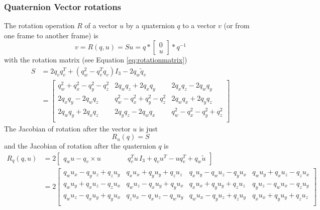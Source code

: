 \subsubsection{Quaternion Vector rotations}
The rotation operation $R$ of a vector $u$ by a quaternion $q$ to a vector $v$ (or from one frame to another frame) is 
\begin{equation}
    v = R (q, u ) = S u = q * \begin{bmatrix} 0 \\ u \end{bmatrix} * q^{-1}
\end{equation}
with the rotation matrix (see Equation \ref{eq:rotationmatrix})
\begin{align}
    S &= 2 q_v q_v^T + (q_w^2-q_v^T q_v) I_3 - 2 q_w \tilde q_v \\
    &= \begin{bmatrix}
         q_w^2 + q_x^2 - q_y^2 - q_z^2 & 2 q_w q_z + 2 q_x q_y & 2 q_x q_z - 2 q_w q_y \\
    2 q_x q_y - 2 q_w q_z & q_w^2 - q_x^2 + q_y^2 - q_z^2 & 2 q_w q_x + 2 q_y q_z \\
    2 q_w q_y + 2 q_x q_z & 2 q_y q_z - 2 q_w q_x & q_w^2 - q_x^2 - q_y^2 + q_z^2 \\
    \end{bmatrix}
\end{align}
The Jacobian of rotation after the vector $u$ is just
\begin{equation}
    R_u(q) = S
\end{equation}
and the Jacobian of rotation after the quaternion $q$ is
\begin{align}
    R_q(q,u) &=  2  \begin{bmatrix}
        q_w u - q_v \times u & \quad \quad \quad q_v^T u \, I_3 + q_v u^T - u q_v^T + q_w \tilde u
    \end{bmatrix} \\
    &= 2 \begin{bmatrix}
        q_w  u_x - q_y  u_z + q_z  u_y & q_x  u_x + q_y  u_y + q_z  u_z & q_x  u_y - q_w  u_z - q_y  u_x & q_w  u_y + q_x  u_z - q_z  u_x \\ 
    q_w  u_y + q_x  u_z - q_z  u_x & q_w  u_z - q_x  u_y + q_y  u_x & q_x  u_x + q_y  u_y + q_z  u_z & q_y  u_z - q_w  u_x - q_z  u_y \\ 
    q_w  u_z - q_x  u_y + q_y  u_x & q_z  u_x - q_x  u_z - q_w  u_y & q_w  u_x - q_y  u_z + q_z  u_y & q_x  u_x + q_y  u_y + q_z  u_z \\ 
    \end{bmatrix}
\end{align}


